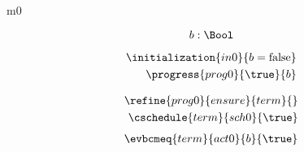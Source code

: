 \documentclass{article}
\begin{document}
	
\begin{machine}{m0}
	
\[
\variable{ b : \Bool }
\]
\begin{description}
\end{description}

\begin{align}
\initialization{in0}{b = \false} \\
\progress{prog0}{\true}{b}
\end{align}

\begin{align}
\refine{prog0}{ensure}{term}{} \\
\cschedule{term}{sch0}{\true} 
\end{align}
\begin{align}
\evbcmeq{term}{act0}{b}{\true}
\end{align}


\end{machine}

\newcommand{\Pcs}{\text{P}}
\end{document}
